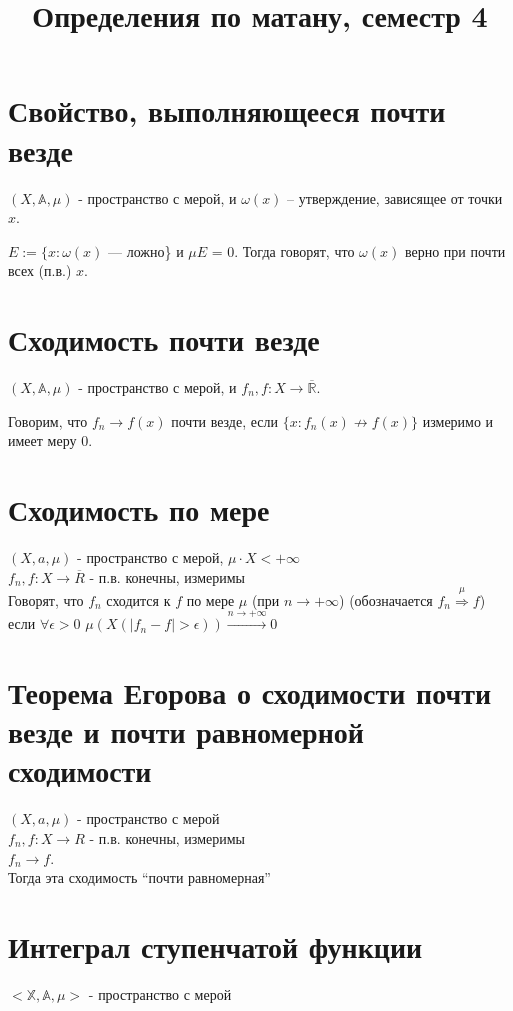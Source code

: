 \documentclass[paper=a4, fontsize=17pt]{article}
\title{Определения по матану, семестр 4}
\begin{document}
	\maketitle
	\tableofcontents
	\newpage
	
	\section{Свойство, выполняющееся почти везде}
	$ (X,\mathds{A},\mu)$  - пространство с мерой, и $\omega (x)$  -- утверждение, зависящее от точки $x$.
	
	$E := \{x: \omega(x) $ --- ложно\} и $\mu E$ = 0. Тогда говорят, что $\omega (x)$ верно при почти всех (п.в.) $x$.
	
	\section{Сходимость почти везде}
	$ (X,\mathds{A},\mu)$  - пространство с мерой, и $f_n, f: X \rightarrow \overline{\mathds{R}}.$
	
	Говорим, что $f_n \rightarrow f(x)$ почти везде, если $\{x: f_n(x) \not \rightarrow f(x)\}$ измеримо и имеет меру $0$.
	
	\section{Сходимость по мере}
	$(X, a, \mu)$ - пространство с мерой, $\mu \cdot X < +\infty$ \\
	$f_n , f : X \rightarrow \overline R$ - п.в. конечны, измеримы\\
	Говорят, что $f_n$ сходится к $f$ по мере $\mu$ (при $n \rightarrow +\infty$) (обозначается $f_n\stackrel{\mu}{\Rightarrow}f$) если $\forall\epsilon > 0$ $\mu(X(|f_n - f| > \epsilon))\stackrel{n\rightarrow+\infty}{\rightarrow} 0$
	
	\section{Теорема Егорова о сходимости почти везде и почти равномерной сходимости}
	$(X, a, \mu)$ - пространство с мерой\\
	$f_n , f : X \rightarrow R$ - п.в. конечны, измеримы \\
	$f_n \rightarrow f$.\\
	Тогда эта сходимость ``почти равномерная''
	
	\section{Интеграл ступенчатой функции}
	$<\mathds{X}, \mathds{A}, \mu>$ - пространство с мерой
	
\end{document}
